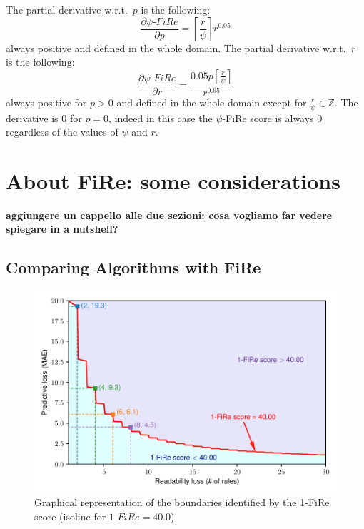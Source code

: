 \documentclass{article}
\newcommand{\fire}{FiRe}
\newcommand{\psifire}{$\psi$-\fire}
\begin{document}
The partial derivative w.r.t.\ $p$ is the following:
%
\begin{equation}
	\frac{\partial \psi\textrm{-}\fire}{\partial p} = \left \lceil{\frac{r}{\psi}}\right \rceil r^{0.05} \label{eq:partialP}
\end{equation}
%
always positive and defined in the whole domain.
%
The partial derivative w.r.t.\ $r$ is the following:
%
\begin{equation}
	\frac{\partial \psi\textrm{-}\fire}{\partial r} = \frac{0.05 p \left \lceil{\frac{r}{\psi}}\right \rceil}{r^{0.95}}\label{eq:partialR}
\end{equation}
%
always positive for $p>0$ and defined in the whole domain except for $\frac{r}{\psi} \in \mathbb{Z}$.
%
The derivative is 0 for $p=0$, indeed in this case the \psifire{} score is always 0 regardless of the values of $\psi$ and $r$.

\section{About \fire{}: some considerations}
\textbf{aggiungere un cappello alle due sezioni: cosa vogliamo far vedere spiegare in a nutshell?}

\subsection{Comparing Algorithms with \fire{}}

\begin{figure}
	\centering
	\includegraphics[width=\linewidth]{figures/boundaries.pdf}
	\caption{Graphical representation of the boundaries identified by the 1-\fire{} score (isoline for $1\textrm{-}\fire{}=40.0$).}\label{fig:boundaries}
\end{figure}
\end{document}
